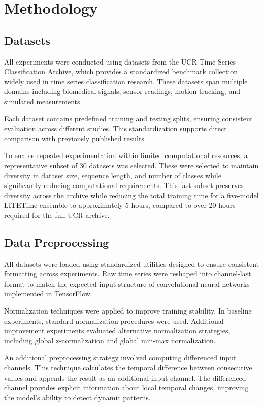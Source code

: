 \documentclass[conference]{IEEEtran}
\begin{document}

\section{Methodology}

\subsection{Datasets}

All experiments were conducted using datasets from the UCR Time Series Classification Archive, which provides a standardized benchmark collection widely used in time series classification research. These datasets span multiple domains including biomedical signals, sensor readings, motion tracking, and simulated measurements.

Each dataset contains predefined training and testing splits, ensuring consistent evaluation across different studies. This standardization supports direct comparison with previously published results.

To enable repeated experimentation within limited computational resources, a representative subset of 30 datasets was selected. These were selected to maintain diversity in dataset size, sequence length, and number of classes while significantly reducing computational requirements. This fast subset preserves diversity across the archive while reducing the total training time for a five-model LITETime ensemble to approximately 5 hours, compared to over 20 hours required for the full UCR archive.

\subsection{Data Preprocessing}

All datasets were loaded using standardized utilities designed to ensure consistent formatting across experiments. Raw time series were reshaped into channel-last format to match the expected input structure of convolutional neural networks implemented in TensorFlow.

Normalization techniques were applied to improve training stability. In baseline experiments, standard normalization procedures were used. Additional improvement experiments evaluated alternative normalization strategies, including global z-normalization and global min-max normalization.

An additional preprocessing strategy involved computing differenced input channels. This technique calculates the temporal difference between consecutive values and appends the result as an additional input channel. The differenced channel provides explicit information about local temporal changes, improving the model's ability to detect dynamic patterns.
\end{document}

